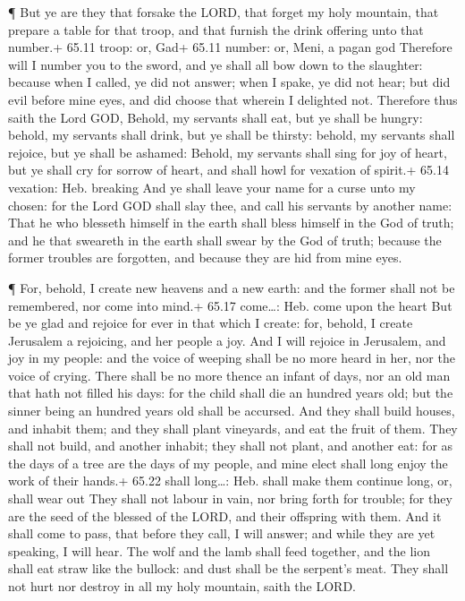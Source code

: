  ¶ But ye are they that forsake the LORD, that forget my
holy mountain, that prepare a table for that troop, and that furnish the
drink offering unto that number.+ 65.11 troop: or, Gad+ 65.11 number:
or, Meni, a pagan god  Therefore will I number you to the
sword, and ye shall all bow down to the slaughter: because when I
called, ye did not answer; when I spake, ye did not hear; but did evil
before mine eyes, and did choose that wherein I delighted not.
 Therefore thus saith the Lord GOD, Behold, my servants
shall eat, but ye shall be hungry: behold, my servants shall drink, but
ye shall be thirsty: behold, my servants shall rejoice, but ye shall be
ashamed:  Behold, my servants shall sing for joy of heart,
but ye shall cry for sorrow of heart, and shall howl for vexation of
spirit.+ 65.14 vexation: Heb. breaking  And ye shall leave
your name for a curse unto my chosen: for the Lord GOD shall slay thee,
and call his servants by another name:  That he who
blesseth himself in the earth shall bless himself in the God of truth;
and he that sweareth in the earth shall swear by the God of truth;
because the former troubles are forgotten, and because they are hid from
mine eyes.

 ¶ For, behold, I create new heavens and a new earth: and
the former shall not be remembered, nor come into mind.+ 65.17
come\ldots: Heb. come upon the heart  But be ye glad and
rejoice for ever in that which I create: for, behold, I create Jerusalem
a rejoicing, and her people a joy.  And I will rejoice in
Jerusalem, and joy in my people: and the voice of weeping shall be no
more heard in her, nor the voice of crying.  There shall be
no more thence an infant of days, nor an old man that hath not filled
his days: for the child shall die an hundred years old; but the sinner
being an hundred years old shall be accursed.  And they
shall build houses, and inhabit them; and they shall plant vineyards,
and eat the fruit of them.  They shall not build, and
another inhabit; they shall not plant, and another eat: for as the days
of a tree are the days of my people, and mine elect shall long enjoy the
work of their hands.+ 65.22 shall long\ldots: Heb. shall make them
continue long, or, shall wear out  They shall not labour in
vain, nor bring forth for trouble; for they are the seed of the blessed
of the LORD, and their offspring with them.  And it shall
come to pass, that before they call, I will answer; and while they are
yet speaking, I will hear.  The wolf and the lamb shall
feed together, and the lion shall eat straw like the bullock: and dust
shall be the serpent's meat. They shall not hurt nor destroy in all my
holy mountain, saith the LORD.

